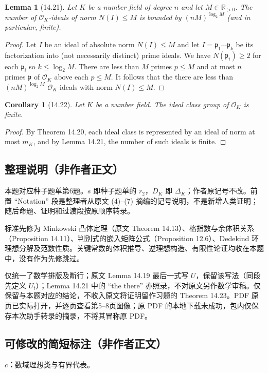 \documentclass[UTF8,11pt]{ctexart}
\newtheorem*{lemma}{Lemma}
\newtheorem*{corollary}{Corollary}
\begin{document}
\begin{lemma}[14.21]
Let $K$ be a number field of degree $n$ and let $M\in\mathbb R_{>0}$. The number of $\mathcal O_K$-ideals of norm $N(I)\le M$ is bounded by $(nM)^{\log_2 M}$ (and in particular, finite).
\end{lemma}
\begin{proof}
Let $I$ be an ideal of absolute norm $N(I)\le M$ and let $I=\mathfrak p_1\cdots\mathfrak p_k$ be its factorization into (not necessarily distinct) prime ideals. We have $N(\mathfrak p_i)\ge2$ for each $\mathfrak p_i$ so $k\le\log_2 M$. There are less than $M$ primes $p\le M$ and at most $n$ primes $\mathfrak p$ of $\mathcal O_K$ above each $p\le M$. It follows that the there are less than $(nM)^{\log_2 M}$ $\mathcal O_K$-ideals with norm $N(I)\le M$.
\end{proof}

\begin{corollary}[14.22]
Let $K$ be a number field. The ideal class group of $\mathcal O_K$ is finite.
\end{corollary}
\begin{proof}
By Theorem 14.20, each ideal class is represented by an ideal of norm at most $m_K$, and by Lemma 14.21, the number of such ideals is finite.
\end{proof}


\subsection*{整理说明（非作者正文）}
本题对应种子题单第6题。$s$ 即种子题单的 $r_2$，$D_K$ 即 $\Delta_K$；作者原记号不改。前置 ``Notation'' 段是整理者从原文 (4)--(7) 摘编的记号说明，不是新增人类证明；随后命题、证明和过渡段按原顺序转录。

标准先修为 Minkowski 凸体定理（原文 Theorem 14.13）、格指数与余体积关系（Proposition 14.11）、判别式的嵌入矩阵公式（Proposition 12.6）、Dedekind 环理想分解及范数性质。关键常数的体积推导、逆理想构造、有限性论证均收在本题中，没有作为先修跳过。

仅统一了数学排版及断行；原文 Lemma 14.19 最后一式写 $U$，保留该写法（同段先定义 $U_t$）；Lemma 14.21 中的 ``the there'' 亦照录，不对原文另作数学审稿。仅保留与本题对应的结论，不收入原文将证明留作习题的 Theorem 14.23。PDF 原页已实际打开，并逐页查看第5--8页图像；原 PDF 的本地下载未成功，包内仅保存本次助手转录的摘录，不将其冒称原 PDF。

\subsection*{可修改的简短标注（非作者正文）}
\textbf{$c$：}数域理想类与有界代表。
\end{document}
